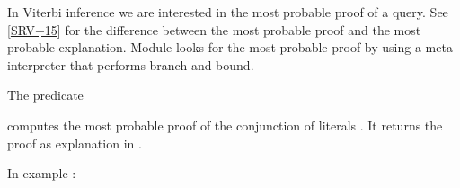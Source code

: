 \documentclass[letterpaper,10pt,english]{sphinxmanual}
\begin{document}
\sphinxAtStartPar
In Viterbi inference we are interested in the most probable proof of a query. See {[}\hyperlink{cite.index:id43}{SRV+15}{]}
for the difference between the most probable proof and the most probable explanation.
Module  looks for the most probable proof by using a meta interpreter
that performs branch and bound.

\sphinxAtStartPar
The predicate

\begin{sphinxVerbatim}[commandchars=\\\{\}]
  
\end{sphinxVerbatim}

\sphinxAtStartPar
computes the most probable proof of the conjunction of literals .
It returns the proof as explanation in .

\sphinxAtStartPar
In example :

\begin{sphinxVerbatim}[commandchars=\\\{\}]
 

 

 

   
   


 
\end{sphinxVerbatim}
\end{document}
